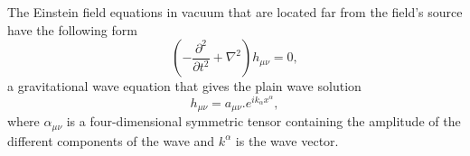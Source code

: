 The Einstein field equations in vacuum that are located far from the field's source have the following form \citep{thesis}
\begin{equation}
    \left(-\frac{\partial^2}{\partial t^{2}} + \nabla^{2}\right)h_{\mu \nu} = 0,
\end{equation}
a gravitational wave equation that gives the plain wave solution
\begin{equation}
    h_{\mu \nu} = a_{\mu \nu}.e^{ik_{\alpha}x^{\alpha}},
    \label{eq: plane}
\end{equation}
where $\alpha_{\mu \nu}$ is a four-dimensional symmetric tensor containing the amplitude of the different components of the wave and $k^{\alpha}$ is the wave vector. 



